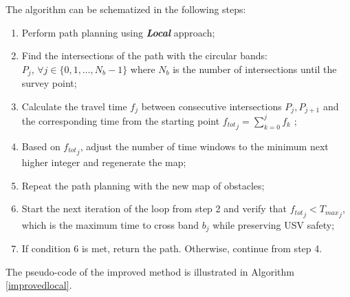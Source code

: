 The algorithm can be schematized in the following steps:
\begin{enumerate}[itemsep=0pt]
	\item Perform path planning using \textbf{\textit{Local}} approach;
	\item Find the intersections of the path with the circular bands: \\ 
	$P_j$, $\forall j \in \{0,1,\ldots,N_b-1\}$ where $N_b$ is the number of intersections until the survey point;
	\item Calculate the travel time $f_j$ between consecutive intersections $P_j,P_{j+1}$ and the corresponding time from the starting point ${f_{tot}}_j = \sum_{k=0}^{j}f_k$ ;
	\item Based on ${f_{tot}}_j$, adjust the number of time windows to the minimum next higher integer and regenerate the map;
	\item Repeat the path planning with the new map of obstacles;
	\item Start the next iteration of the loop from step 2 and verify that ${f_{tot}}_j< {T_{max}}_j$, which is the maximum time to cross band $b_j$ while preserving USV safety;
	\item If condition 6 is met, return the path. Otherwise, continue from step 4.
\end{enumerate}
The pseudo-code of the improved method is illustrated in Algorithm \ref{improvedlocal}. 

